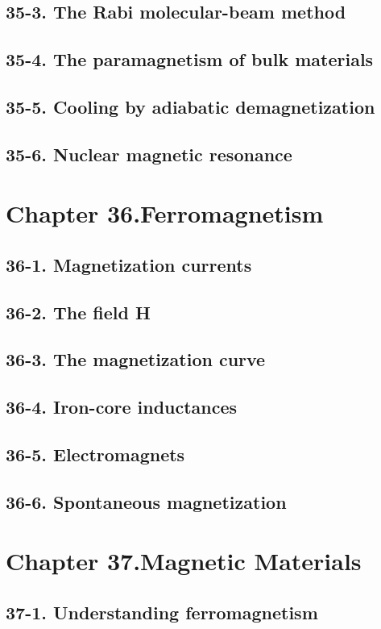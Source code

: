 \documentclass{article}
\begin{document}
\subsection{35-3. The Rabi molecular-beam method}
\subsection{35-4. The paramagnetism of bulk materials}
\subsection{35-5. Cooling by adiabatic demagnetization}
\subsection{35-6. Nuclear magnetic resonance}
\section{Chapter 36.Ferromagnetism}
\subsection{36-1. Magnetization currents}
\subsection{36-2. The field H}
\subsection{36-3. The magnetization curve}
\subsection{36-4. Iron-core inductances}
\subsection{36-5. Electromagnets}
\subsection{36-6. Spontaneous magnetization}
\section{Chapter 37.Magnetic Materials}
\subsection{37-1. Understanding ferromagnetism}
\end{document}

